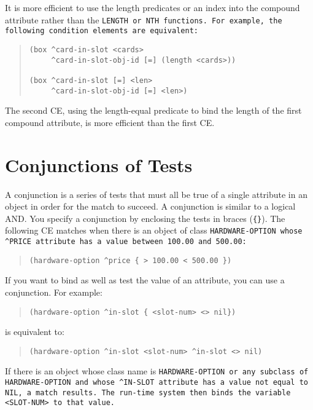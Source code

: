 It is more efficient to use the length predicates or an index into the
compound attribute rather than the \tt{LENGTH} or \tt{NTH} functions. For
example, the following condition elements are equivalent:
\begin{quote}
\begin{verbatim}
(box ^card-in-slot <cards>
     ^card-in-slot-obj-id [=] (length <cards>))

(box ^card-in-slot [=] <len>
     ^card-in-slot-obj-id [=] <len>)
\end{verbatim}
\end{quote}
The second CE, using the length-equal predicate to bind the length of
the first compound attribute, is more efficient than the first CE.

  \section{Conjunctions of Tests}

  A conjunction is a series of tests that must all be true
  of a single attribute in an object in order for the
  match to succeed. A conjunction is similar to a logical
  AND. You specify a conjunction by enclosing the tests in
  braces (\verb|{}|). The following CE matches when there is an
  object of class \tt{HARDWARE-OPTION} whose \verb|^PRICE| attribute
  has a value between 100.00 and 500.00:
\begin{quote}
\begin{verbatim}
(hardware-option ^price { > 100.00 < 500.00 })
\end{verbatim}
\end{quote}
If you want to bind as well as test the value of an
  attribute, you can use a conjunction. For example:
\begin{quote}
\begin{verbatim}
(hardware-option ^in-slot { <slot-num> <> nil})
\end{verbatim}
\end{quote}
is equivalent to:
\begin{quote}
\begin{verbatim}
(hardware-option ^in-slot <slot-num> ^in-slot <> nil)
\end{verbatim}
\end{quote}

  If there is an object whose class name is
  \tt{HARDWARE-OPTION} or any subclass of \tt{HARDWARE-OPTION} and
  whose \verb|^IN-SLOT| attribute has a value not equal to \tt{NIL}, a
  match results. The run-time system then binds the
  variable \verb|<SLOT-NUM>| to that value.

